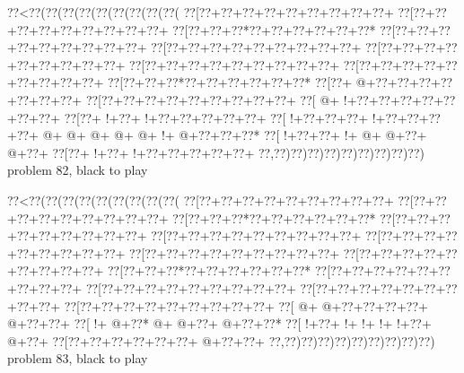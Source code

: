 \vbox{\vbox{\goo
\0??<\0??(\0??(\0??(\0??(\0??(\0??(\0??(\0??(\0??(
\0??[\0??+\0??+\0??+\0??+\0??+\0??+\0??+\0??+\0??+
\0??[\0??+\0??+\0??+\0??+\0??+\0??+\0??+\0??+\0??+
\0??[\0??+\0??+\0??*\0??+\0??+\0??+\0??+\0??+\0??*
\0??[\0??+\0??+\0??+\0??+\0??+\0??+\0??+\0??+\0??+
\0??[\0??+\0??+\0??+\0??+\0??+\0??+\0??+\0??+\0??+
\0??[\0??+\0??+\0??+\0??+\0??+\0??+\0??+\0??+\0??+
\0??[\0??+\0??+\0??+\0??+\0??+\0??+\0??+\0??+\0??+
\0??[\0??+\0??+\0??+\0??+\0??+\0??+\0??+\0??+\0??+
\0??[\0??+\0??+\0??*\0??+\0??+\0??+\0??+\0??+\0??*
\0??[\0??+\- @+\0??+\0??+\0??+\0??+\0??+\0??+\0??+
\0??[\0??+\0??+\0??+\0??+\0??+\0??+\0??+\0??+\0??+
\0??[\- @+\- !+\0??+\0??+\0??+\0??+\0??+\0??+\0??+
\0??[\0??+\- !+\0??+\- !+\0??+\0??+\0??+\0??+\0??+
\0??[\- !+\0??+\0??+\0??+\- !+\0??+\0??+\0??+\0??+
\- @+\- @+\- @+\- @+\- @+\- !+\- @+\0??+\0??+\0??*
\0??[\- !+\0??+\0??+\- !+\- @+\- @+\0??+\- @+\0??+
\0??[\0??+\- !+\0??+\- !+\0??+\0??+\0??+\0??+\0??+
\0??,\0??)\0??)\0??)\0??)\0??)\0??)\0??)\0??)\0??)
}
\hfil problem 82, black to play\hfil\break
}

\vbox{\vbox{\goo
\0??<\0??(\0??(\0??(\0??(\0??(\0??(\0??(\0??(\0??(
\0??[\0??+\0??+\0??+\0??+\0??+\0??+\0??+\0??+\0??+
\0??[\0??+\0??+\0??+\0??+\0??+\0??+\0??+\0??+\0??+
\0??[\0??+\0??+\0??*\0??+\0??+\0??+\0??+\0??+\0??*
\0??[\0??+\0??+\0??+\0??+\0??+\0??+\0??+\0??+\0??+
\0??[\0??+\0??+\0??+\0??+\0??+\0??+\0??+\0??+\0??+
\0??[\0??+\0??+\0??+\0??+\0??+\0??+\0??+\0??+\0??+
\0??[\0??+\0??+\0??+\0??+\0??+\0??+\0??+\0??+\0??+
\0??[\0??+\0??+\0??+\0??+\0??+\0??+\0??+\0??+\0??+
\0??[\0??+\0??+\0??*\0??+\0??+\0??+\0??+\0??+\0??*
\0??[\0??+\0??+\0??+\0??+\0??+\0??+\0??+\0??+\0??+
\0??[\0??+\0??+\0??+\0??+\0??+\0??+\0??+\0??+\0??+
\0??[\0??+\0??+\0??+\0??+\0??+\0??+\0??+\0??+\0??+
\0??[\0??+\0??+\0??+\0??+\0??+\0??+\0??+\0??+\0??+
\0??[\- @+\- @+\0??+\0??+\0??+\0??+\- @+\0??+\0??+
\0??[\- !+\- @+\0??*\- @+\- @+\0??+\- @+\0??+\0??*
\0??[\- !+\0??+\- !+\- !+\- !+\- !+\0??+\- @+\0??+
\0??[\0??+\0??+\0??+\0??+\0??+\0??+\- @+\0??+\0??+
\0??,\0??)\0??)\0??)\0??)\0??)\0??)\0??)\0??)\0??)
}
\hfil problem 83, black to play\hfil\break
}

